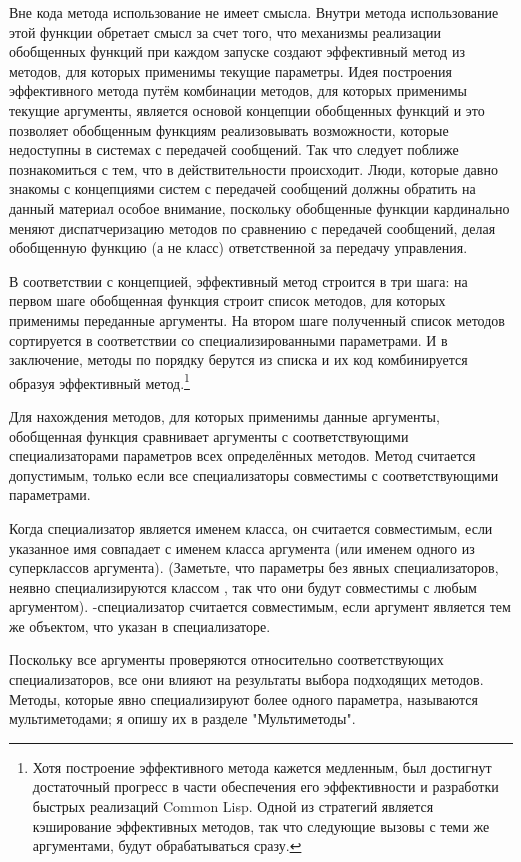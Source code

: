 Вне кода метода использование  не имеет смысла.  Внутри метода
использование этой функции обретает смысл за счет того, что механизмы реализации
обобщенных функций при каждом запуске создают эффективный метод из методов, для которых
применимы текущие параметры.  Идея построения эффективного метода путём комбинации
методов, для которых применимы текущие аргументы, является основой концепции обобщенных
функций и это позволяет обобщенным функциям реализовывать возможности, которые недоступны
в системах с передачей сообщений.  Так что следует поближе познакомиться с тем, что в
действительности происходит.  Люди, которые давно знакомы с концепциями систем с передачей
сообщений должны обратить на данный материал особое внимание, поскольку обобщенные функции
кардинально меняют диспатчеризацию методов по сравнению с передачей сообщений, делая
обобщенную функцию (а не класс) ответственной за передачу управления.

В соответствии с концепцией, эффективный метод строится в три шага: на первом шаге
обобщенная функция строит список методов, для которых применимы переданные аргументы.  На
втором шаге полученный список методов сортируется в соответствии со специализированными
параметрами.  И в заключение, методы по порядку берутся из списка и их код комбинируется
образуя эффективный метод.\footnote{Хотя построение эффективного метода кажется медленным,
  был достигнут достаточный прогресс в части обеспечения его эффективности и разработки
  быстрых реализаций Common Lisp.  Одной из стратегий является кэширование эффективных
  методов, так что следующие вызовы с теми же аргументами, будут обрабатываться сразу.}

Для нахождения методов, для которых применимы данные аргументы, обобщенная функция
сравнивает аргументы с соответствующими специализаторами параметров всех определённых
методов.  Метод считается допустимым, только если все специализаторы совместимы с
соответствующими параметрами.

Когда специализатор является именем класса, он считается совместимым, если указанное имя
совпадает с именем класса аргумента (или именем одного из суперклассов аргумента).
(Заметьте, что параметры без явных специализаторов, неявно специализируются классом
, так что они будут совместимы с любым аргументом).  -специализатор
считается совместимым, если аргумент является тем же объектом, что указан в
специализаторе.

Поскольку все аргументы проверяются относительно соответствующих специализаторов, все они
влияют на результаты выбора подходящих методов.  Методы, которые явно специализируют более
одного параметра, называются мультиметодами; я опишу их в разделе "Мультиметоды".

